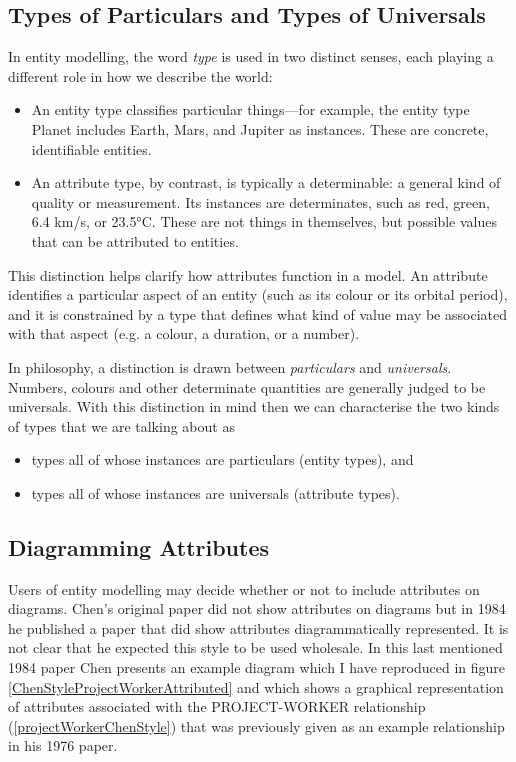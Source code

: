 \subsection{Types of Particulars and Types of Universals}
In entity modelling, the word \textit{type} is used in two distinct senses, each playing a different role in how we describe the world:
\begin{itemize}
\item An entity type classifies particular things—for example, the entity type Planet includes Earth, Mars, and Jupiter as instances. These are concrete, identifiable entities.
\item An attribute type, by contrast, is typically a determinable: a general kind of quality or measurement. Its instances are determinates, such as red, green, 6.4 km/s, or 23.5°C. These are not things in themselves, but possible values that can be attributed to entities.
\end{itemize}
This distinction helps clarify how attributes function in a model. An attribute identifies a particular aspect of an entity (such as its colour or its orbital period), and it is constrained by a type that defines what kind of value may be associated with that aspect (e.g. a colour, a duration, or a number).

In philosophy, a distinction is drawn between \textit{particulars} and \textit{universals}. 
Numbers, colours and  other determinate quantities are generally judged to be universals. 
With this distinction in mind then we can characterise the two kinds of types that we are
talking about as
\begin{itemize}
\item types all of whose instances are particulars (entity types), and
\item types all of whose instances are universals (attribute types).  
\end{itemize} 

\subsection*{Diagramming Attributes}
\mynote
Users of entity modelling may decide whether or not to include attributes on diagrams. Chen's original paper did not show attributes on diagrams  but in 1984
he published a paper that did show attributes diagrammatically represented. 
It is not clear that he expected this style to be used wholesale. 
\mynote
In this last mentioned 1984 paper Chen presents an example diagram 
which I have reproduced in figure  \ref{ChenStyleProjectWorkerAttributed} 
and which shows a graphical representation of attributes associated with the PROJECT-WORKER relationship (\ref{projectWorkerChenStyle}) that was previously given as an example relationship in his 1976 paper.

